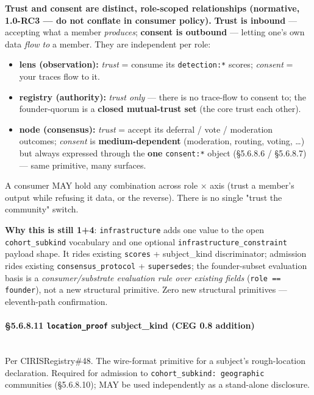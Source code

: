 \documentclass[10pt]{article}
\begin{document}
\textbf{Trust and consent are distinct, role-scoped relationships (normative, 1.0-RC3 — do not conflate in consumer policy).} \textbf{Trust is inbound} — accepting what a member \textit{produces}; \textbf{consent is outbound} — letting one's own data \textit{flow to} a member. They are independent per role:

\begin{itemize}\setlength\itemsep{0pt}
\item \textbf{lens (observation):} \textit{trust} = consume its \texttt{detection:*} scores; \textit{consent} = your traces flow to it.
\item \textbf{registry (authority):} \textit{trust only} — there is no trace-flow to consent to; the founder-quorum is a \textbf{closed mutual-trust set} (the core trust each other).
\item \textbf{node (consensus):} \textit{trust} = accept its deferral / vote / moderation outcomes; \textit{consent} is \textbf{medium-dependent} (moderation, routing, voting, …) but always expressed through the \textbf{one} \texttt{consent:*} object (§5.6.8.6 / §5.6.8.7) — same primitive, many surfaces.
\end{itemize}


A consumer MAY hold any combination across role × axis (trust a member's output while refusing it data, or the reverse). There is no single "trust the community" switch.


\textbf{Why this is still 1+4}: \texttt{infrastructure} adds one value to the open \texttt{cohort\_subkind} vocabulary and one optional \texttt{infrastructure\_constraint} payload shape. It rides existing \texttt{scores} + subject\_kind discriminator; admission rides existing \texttt{consensus\_protocol} + \texttt{supersedes}; the founder-subset evaluation basis is a \textit{consumer/substrate evaluation rule over existing fields} (\texttt{role == founder}), not a new structural primitive. Zero new structural primitives — eleventh-path confirmation.


\paragraph{§5.6.8.11 \texttt{location\_proof} subject\_kind (CEG 0.8 addition)}\mbox{}\\


Per CIRISRegistry\#48. The wire-format primitive for a subject's rough-location declaration. Required for admission to \texttt{cohort\_subkind: geographic} communities (§5.6.8.10); MAY be used independently as a stand-alone disclosure.
\end{document}
